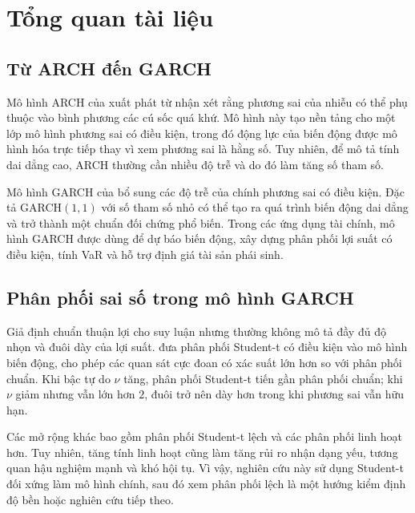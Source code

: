 \documentclass[12pt,a4paper]{article}
\numberwithin{equation}{section}
\begin{document}
\section{Tổng quan tài liệu}\label{sec:tong-quan}

\subsection{Từ ARCH đến GARCH}\label{subsec:arch-garch-review}

Mô hình ARCH của \cite{engle1982} xuất phát từ nhận xét rằng phương sai của nhiễu có thể phụ thuộc vào bình phương các cú sốc quá khứ. Mô hình này tạo nền tảng cho một lớp mô hình phương sai có điều kiện, trong đó động lực của biến động được mô hình hóa trực tiếp thay vì xem phương sai là hằng số. Tuy nhiên, để mô tả tính dai dẳng cao, ARCH thường cần nhiều độ trễ và do đó làm tăng số tham số.

Mô hình GARCH của \cite{bollerslev1986} bổ sung các độ trễ của chính phương sai có điều kiện. Đặc tả GARCH$(1,1)$ với số tham số nhỏ có thể tạo ra quá trình biến động dai dẳng và trở thành một chuẩn đối chứng phổ biến. Trong các ứng dụng tài chính, mô hình GARCH được dùng để dự báo biến động, xây dựng phân phối lợi suất có điều kiện, tính VaR và hỗ trợ định giá tài sản phái sinh.

\subsection{Phân phối sai số trong mô hình GARCH}\label{subsec:dist-review}

Giả định chuẩn thuận lợi cho suy luận nhưng thường không mô tả đầy đủ độ nhọn và đuôi dày của lợi suất. \cite{bollerslev1987} đưa phân phối Student-t có điều kiện vào mô hình biến động, cho phép các quan sát cực đoan có xác suất lớn hơn so với phân phối chuẩn. Khi bậc tự do $\nu$ tăng, phân phối Student-t tiến gần phân phối chuẩn; khi $\nu$ giảm nhưng vẫn lớn hơn $2$, đuôi trở nên dày hơn trong khi phương sai vẫn hữu hạn.

Các mở rộng khác bao gồm phân phối Student-t lệch và các phân phối linh hoạt hơn. Tuy nhiên, tăng tính linh hoạt cũng làm tăng rủi ro nhận dạng yếu, tương quan hậu nghiệm mạnh và khó hội tụ. Vì vậy, nghiên cứu này sử dụng Student-t đối xứng làm mô hình chính, sau đó xem phân phối lệch là một hướng kiểm định độ bền hoặc nghiên cứu tiếp theo.
\end{document}
